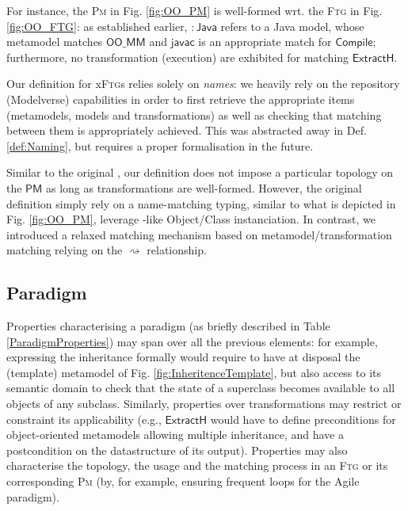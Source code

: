 For instance, the \textsc{Pm} in Fig. \ref{fig:OO_PM} is well-formed wrt. 
the \textsc{Ftg} in Fig. \ref{fig:OO_FTG}: as established earlier, 
$\mathsf{:\!Java}$ refers to a Java model, whose metamodel matches 
$\mathsf{OO\_MM}$ and $\mathsf{javac}$ is an appropriate match for 
$\mathsf{Compile}$; furthermore, no transformation (execution) are exhibited for 
matching $\mathsf{ExtractH}$.

Our definition for x\textsc{Ftg}s relies solely on \emph{names}: we heavily 
rely on the repository (Modelverse) capabilities in order to first retrieve the 
appropriate items (metamodels, models and transformations) as well as checking 
that matching between them is appropriately achieved. This was abstracted away 
in Def. \ref{def:Naming}, but requires a proper formalisation in the future.

Similar to the original  
\cite{Mustafiz-etAl:2012,Lucio-Mustafiz-etAl:2013,TR:Lucio-Mustafiz-etAl:2012},
our definition does not impose a particular topology on the $\mathsf{PM}$ as 
long as transformations are well-formed. However, the original definition 
simply rely on a name-matching typing, similar to what is depicted in Fig. 
\ref{fig:OO_PM}, leverage \UML{}-like Object/Class instanciation. In contrast, 
we introduced a relaxed matching mechanism based on metamodel/transformation 
matching relying on the $\rightsquigarrow$ relationship.

\subsection{Paradigm}
\label{sec:PS}

Properties characterising a paradigm (as briefly described in Table 
\ref{ParadigmProperties}) may span over all the previous elements: for example, 
expressing the inheritance formally would require to have at disposal the 
(template) metamodel of Fig. \ref{fig:InheritenceTemplate}, but also access to 
its semantic domain to check that the state of a superclass becomes available 
to all objects of any subclass. Similarly, properties over transformations may 
restrict or constraint its applicability (e.g., $\mathsf{ExtractH}$ would have 
to define preconditions for object-oriented metamodels allowing multiple 
inheritance, and have a postcondition on the datastructure of its output). 
Properties may also characterise the topology, the usage and the matching 
process in an \textsc{Ftg} or its corresponding \textsc{Pm} (by, for example, 
ensuring frequent loops for the Agile paradigm). 

